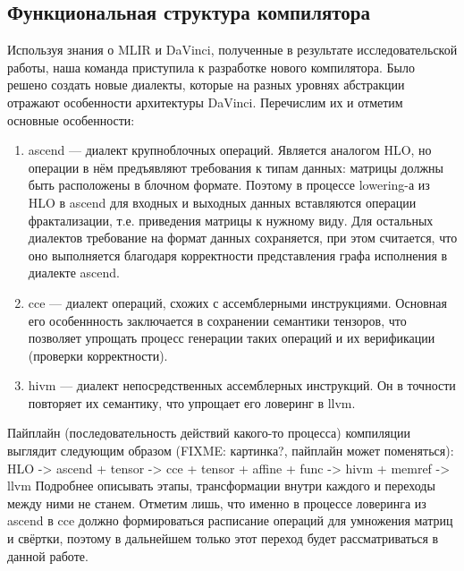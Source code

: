 \subsection{Функциональная структура компилятора}
\label{impl:compiler} %

Используя знания о MLIR и DaVinci, полученные в результате исследовательской
работы, наша команда приступила к разработке нового компилятора. Было решено
создать новые диалекты, которые на разных уровнях абстракции отражают
особенности архитектуры DaVinci. Перечислим их и отметим основные особенности:

\begin{enumerate}
    \item ascend --- диалект крупноблочных операций. Является аналогом HLO, но
          операции в нём предъявляют требования к типам данных: матрицы должны
          быть расположены в блочном формате. Поэтому в процессе lowering-а
          из HLO в ascend для входных и выходных данных вставляются операции
          фрактализации, т.е. приведения матрицы к нужному виду. Для остальных
          диалектов требование на формат данных сохраняется, при этом считается,
          что оно выполняется благодаря корректности представления графа
          исполнения в диалекте ascend.

    \item cce --- диалект операций, схожих с ассемблерными инструкциями.
          Основная его особеннность заключается в сохранении семантики
          тензоров, что позволяет упрощать процесс генерации таких операций и
          их верификации (проверки корректности).

    \item hivm --- диалект непосредственных ассемблерных инструкций. Он в
          точности повторяет их семантику, что упрощает его ловеринг в llvm.
\end{enumerate}

Пайплайн (последовательность действий какого-то процесса) компиляции выглядит
следующим образом (FIXME: картинка?, пайплайн может поменяться):
HLO -> ascend + tensor -> cce + tensor + affine + func -> hivm + memref -> llvm
Подробнее описывать этапы, трансформации внутри каждого и переходы между ними не
станем. Отметим лишь, что именно в процессе ловеринга из ascend в cce должно
формироваться расписание операций для умножения матриц и свёртки, поэтому в
дальнейшем только этот переход будет рассматриваться в данной работе.
